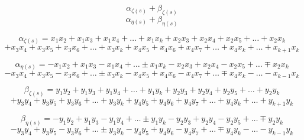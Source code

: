 \documentclass{amsart}
\begin{document}
	\[ \alpha_{\zeta(s)} + \beta_{\zeta(s)} \]
	\[ \alpha_{\eta(s)} + \beta_{\eta(s)} \]
	
	\[ \alpha_{\zeta(s)} = x_1x_2 + x_1x_3 + x_1x_4 + \dots + x_{1}x_{k} +x_2x_3 + x_2x_4 + x_2x_5 + \dots + x_{2}x_{k} \]
	\[ +x_3x_4 + x_3x_5 + x_3x_6 + \dots + x_{3}x_{k} +x_4x_5 + x_4x_6 + x_4x_7 + \dots + x_{4}x_{k} + \dots + x_{k+1}x_{k} \]
	
	\[ \alpha_{\eta(s)} = -x_1x_2 + x_1x_3 - x_1x_4 + \dots \pm x_{1}x_{k} -x_2x_3 + x_2x_4 - x_2x_5 + \dots \mp x_{2}x_{k} \]
	\[ -x_3x_4 + x_3x_5 - x_3x_6 + \dots \pm x_{3}x_{k} -x_4x_5 + x_4x_6 - x_4x_7 + \dots \mp x_{4}x_{k} - \dots - x_{k-1}x_{k} \]
	
	\[ \beta_{\zeta(s)} = y_1y_2 + y_1y_3 + y_1y_4 + \dots + y_{1}y_{k} +y_2y_3 + y_2y_4 + y_2y_5 + \dots + y_{2}y_{k} \]
	\[ +y_3y_4 + y_3y_5 + y_3y_6 + \dots + y_{3}y_{k} +y_4y_5 + y_4y_6 + y_4y_7 + \dots + y_{4}y_{k} + \dots + y_{k+1}y_{k} \]
	
	\[ \beta_{\eta(s)} = -y_1y_2 + y_1y_3 - y_1y_4 + \dots \pm y_{1}y_{k} -y_2y_3 + y_2y_4 - y_2y_5 + \dots \mp y_{2}y_{k} \]
	\[ -y_3y_4 + y_3y_5 - y_3y_6 + \dots \pm y_{3}y_{k} -y_4y_5 + y_4y_6 - y_4y_7 + \dots \mp y_{4}y_{k} - \dots - y_{k-1}y_{k} \]
	
\end{document}
